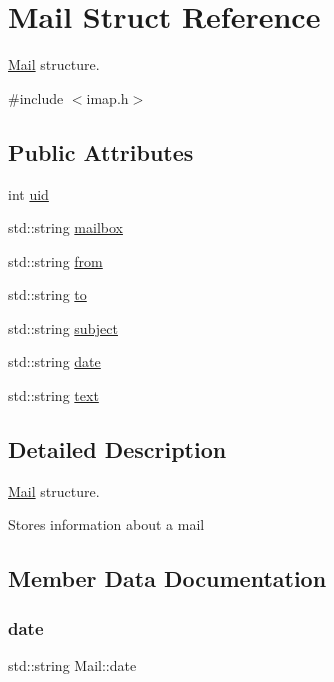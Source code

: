 \hypertarget{structMail}{}\section{Mail Struct Reference}
\label{structMail}


\hyperlink{structMail}{Mail} structure.  




{\ttfamily \#include $<$imap.\+h$>$}

\subsection*{Public Attributes}
\begin{DoxyCompactItemize}
\item 
int \hyperlink{structMail_acbed469265bf0f0ad1c77b07e935dd05}{uid}
\item 
std\+::string \hyperlink{structMail_ad3818de846b58c9865ad79c74ef38d4f}{mailbox}
\item 
std\+::string \hyperlink{structMail_ab870c9583b0e46138dc1a8f1d1b65a3d}{from}
\item 
std\+::string \hyperlink{structMail_a4fdcc092522dd634b8085b7c8e7831e8}{to}
\item 
std\+::string \hyperlink{structMail_a8bc2e13257b7a771c9065e35aaf02744}{subject}
\item 
std\+::string \hyperlink{structMail_aee9bc87682f6173b92bf135397f38162}{date}
\item 
std\+::string \hyperlink{structMail_a41cf2dc6ed53c53e9c85e9c9dc5caa61}{text}
\end{DoxyCompactItemize}


\subsection{Detailed Description}
\hyperlink{structMail}{Mail} structure. 

Stores information about a mail 

\subsection{Member Data Documentation}
\mbox{\label{structMail_aee9bc87682f6173b92bf135397f38162}} 
\subsubsection{\texorpdfstring{date}{date}}
{\footnotesize\ttfamily std\+::string Mail\+::date}

